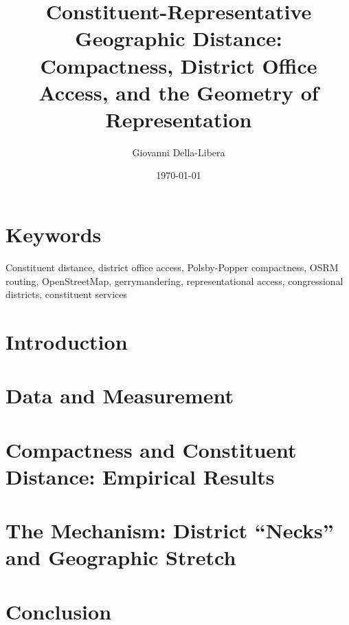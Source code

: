 \documentclass[12pt]{article}
\title{\textbf{Constituent-Representative Geographic Distance:\\
Compactness, District Office Access, and the Geometry of Representation}}
\author{Giovanni Della-Libera}
\date{\today}
\begin{document}
\maketitle

\begin{abstract}

\end{abstract}

\section*{Keywords}
Constituent distance, district office access, Polsby-Popper compactness,
OSRM routing, OpenStreetMap, gerrymandering, representational access,
congressional districts, constituent services

\section{Introduction}


\section{Data and Measurement}


\section{Compactness and Constituent Distance: Empirical Results}


\section{The Mechanism: District ``Necks'' and Geographic Stretch}


\section{Conclusion}




\end{document}
